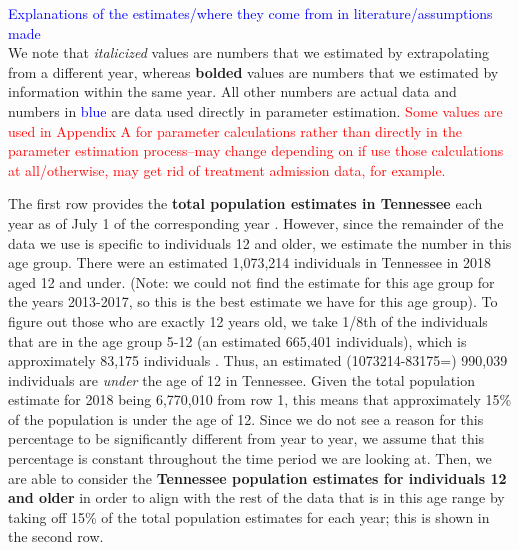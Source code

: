 \documentclass[12pt]{article}
\begin{document}
 \textcolor{blue}{Explanations of the estimates/where they come from in literature/assumptions made} \\ 
We note that \textit{italicized} values are numbers that we estimated by extrapolating from a different year, whereas \textbf{bolded} values are numbers that we estimated by information within the same year. All other numbers are actual data and numbers in \textcolor{blue}{blue} are data used directly in parameter estimation. \textcolor{red}{Some values are used in Appendix A for parameter calculations rather than directly in the parameter estimation process--may change depending on if use those calculations at all/otherwise, may get rid of treatment admission data, for example.}
 
The first row provides the \textbf{total population estimates in Tennessee} each year as of July 1 of the corresponding year \cite{USCensus}. 
However, since the remainder of the data we use is specific to individuals 12 and older, we estimate the number in this age group. 
There were an estimated 1,073,214 individuals in Tennessee in 2018 aged 12 and under. (Note: we could not find the estimate for this age group for the years 2013-2017, so this is the best estimate we have for this age group). To figure out those who are exactly 12 years old, we take 1/8th of the individuals that are in the age group 5-12 (an estimated 665,401 individuals), which is approximately 83,175 individuals \cite{DOHHS}. Thus, an estimated (1073214-83175=) 990,039 individuals are \emph{under} the age of 12 in Tennessee. Given the total population estimate for 2018 being 6,770,010 from row 1, this means that approximately 15\% of the population is under the age of 12. Since we do not see a reason for this percentage to be significantly different from year to year, we assume that this percentage is constant throughout the time period we are looking at. Then, we are able to consider the \textbf{Tennessee population estimates for individuals 12 and older} in order to align with the rest of the data that is in this age range by taking off 15\% of the total population estimates for each year; this is shown in the second row.  \\
\end{document}
